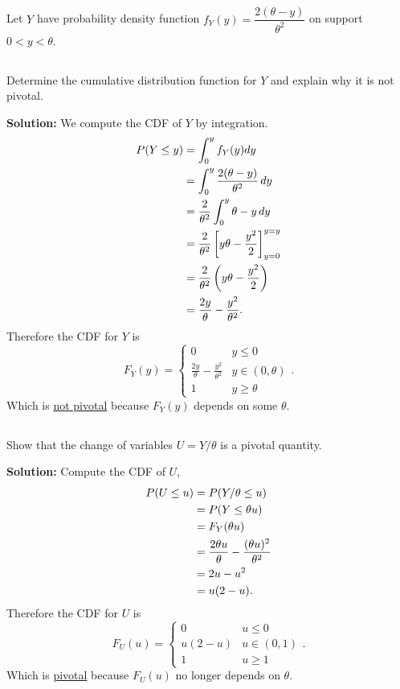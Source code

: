 \section{}
Let $Y$ have probability density function $f_Y(y)=\dfrac{2(\theta-y)}{\theta^2}$ on support $0<y<\theta$.
\subsection{}
    Determine the cumulative distribution function for $Y$ and explain why it is not pivotal.
    \begin{mybox}
        \textbf{Solution: } We compute the CDF of $Y$ by integration.
        \begin{align}
            P(Y \leq y)
            &= \int_0^y f_Y(y)dy \notag\\
            &= \int_{0}^{y} \frac{2(\theta-y)}{\theta^2}\,dy\notag\\
            &= \frac{2}{\theta^2} \int_{0}^{y} \theta - y \,dy\notag\\
            &= \frac{2}{\theta^2} \left[ {y\theta - \frac{y^2}{2}} \right]_{y=0}^{y=y}\notag\\
            &= \frac{2}{\theta^2} \left( {y\theta - \frac{y^2}{2}} \right)\notag\\
            &= \frac{2y}{\theta} - \frac{y^2}{\theta^2}.\notag
        \end{align}
        Therefore the CDF for $Y$ is
        $$F_Y(y) = \begin{cases}0 & y \leq 0\\\frac{2y}{\theta} - \frac{y^2}{\theta^2} & y \in (0, \theta)\\1 & y \geq \theta\end{cases}.$$
        Which is \underline{not pivotal} because $F_Y(y)$ depends on some $\theta$.
    \end{mybox}
    \newpage
\subsection{}
    Show that the change of variables $U=Y/\theta$ is a pivotal quantity.
    \begin{mybox}
        \textbf{Solution: } Compute the CDF of $U$,
        \begin{align}
            P(U \leq u)
            &= P(Y/\theta \leq u) \notag\\
            &= P(Y \leq \theta u) \notag\\
            &= F_Y(\theta u) \notag\\
            &= \frac{2\theta u}{\theta} - \frac{ (\theta u)^2}{\theta^2} \notag\\
            &= 2u - u^2\notag\\
            &= u(2-u).\notag
        \end{align}
        Therefore the CDF for $U$ is
        $$F_U(u) = \begin{cases}0 & u \leq 0\\u(2-u) & u \in (0, 1)\\1 & u \geq 1\end{cases}.$$
        Which is \underline{pivotal} because $F_U(u)$ no longer depends on $\theta$.
    \end{mybox}
